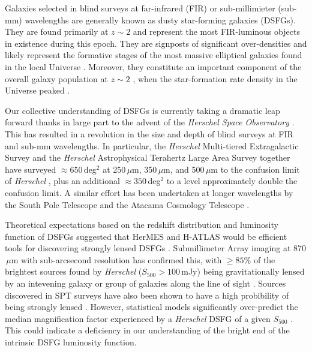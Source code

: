 \documentclass[iop]{emulateapj}
\begin{document}
Galaxies selected in blind surveys at far-infrared (FIR) or sub-millimieter
(sub-mm) wavelengths are generally known as dusty star-forming galaxies (DSFGs).
They are found primarily at $z \sim2$ \citep{2005ApJ...622..772C,
Bothwell:2013lr} \citep[but extend down to $z \sim 1$ and up to $z > 6$;
see][]{Messias:2014fk, Riechers:2013lr} and represent the most FIR-luminous
objects in existence during this epoch.   They are signposts of significant
over-densities \citep{Daddi:2009qy, Capak:2011qy} and likely represent the
formative stages of the most massive elliptical galaxies found in the local
Universe \citep[e.g.,][]{Ivison:2013fk, Fu:2013lr}.  Moreover, they constitute
an important component of the overall galaxy population at $z \sim 2$
\citep[e.g.,][]{2005ApJ...632..169L}, when the star-formation rate density in
the Universe peaked \citep[e.g.,][]{Lilly:1996uq, 1996MNRAS.283.1388M}.  

Our collective understanding of DSFGs is currently taking a dramatic leap
forward thanks in large part to the advent of the {\it Herschel Space
Observatory} \citep[{\it Herschel};][]{Pilbratt:2010fk}.  This has resulted in a
revolution in the size and depth of blind surveys at FIR and sub-mm wavelengths.
In particular, the {\it Herschel} Multi-tiered Extragalactic Survey
\citep[HerMES;][]{Oliver:2012lr} and the {\it Herschel} Astrophysical Terahertz
Large Area Survey \citep[H-ATLAS;][]{2010PASP..122..499E} together have surveyed
$\approx 650\,$deg$^2$ at 250$\,\mu$m, 350$\,\mu$m, and 500$\,\mu$m to the
confusion limit of {\it Herschel} \citep[$\sigma \approx 6-7\,$mJy in each
band][]{Nguyen:2010fk}, plus an additional $\approx 350\,$deg$^2$ to a level
approximately double the confusion limit.  A similar effort has been undertaken
at longer wavelengths by the South Pole Telescope
\citep[SPT;][]{Carlstrom:2011qy} and the Atacama Cosmology Telescope
\citep{Swetz:2011qy}.

Theoretical expectations based on the redshift distribution and luminosity
function of DSFGs suggested that HerMES and H-ATLAS would be efficient tools for
discovering strongly lensed DSFGs \citep[e.g.,][]{1996MNRAS.283.1340B,
2007MNRAS.377.1557N}.  Submillimeter Array \citep[SMA;][]{Ho:2004lr} imaging at
870$\,\mu$m with sub-arcsecond resolution has confirmed this, with $\geq 85\%$
of the brightest sources found by {\it Herschel} ($S_{500} > 100\,$mJy) being
gravitationally lensed by an intevening galaxy or group of galaxies along the
line of sight \citep{Negrello:2010fk, Conley:2011lr, Riechers:2011uq,
Bussmann:2012lr, Wardlow:2013lr, Bussmann:2013lr}.  Sources discovered in SPT
surveys have also been shown to have a high probibility of being strongly lensed
\citep{Vieira:2013fk, Hezaveh:2013fk}.  However, statistical models
significantly over-predict the median magnification factor experienced by a {\it
Herschel} DSFG of a given $S_{500}$ \citep{Bussmann:2013lr}.  This could
indicate a deficiency in our understanding of the bright end of the intrinsic
DSFG luminosity function.
\end{document}
